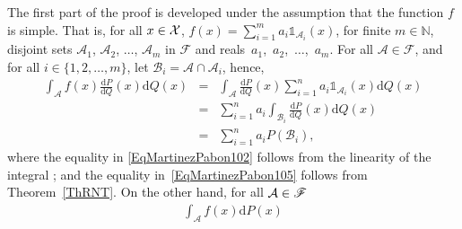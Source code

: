 \documentclass[lettersize,onecolumn]{IEEEtran}
\begin{document}
\begin{IEEEproof}
The first part of the proof is developed under the assumption that the function $f$ is simple. That is, for all $x \in \mathcal X$, 
%
 $f(x) = \sum_{i=1}^{m} a_i \mathds{1}_{\mathcal{A}_i} (x)$, for finite $m \in \mathds{N}$, disjoint sets $\mathcal{A}_1$, $\mathcal{A}_2$, $\ldots$, $\mathcal{A}_m$ in $\mathscr{F}$  and reals~$a_1$,~$a_2$,~$\ldots$,~$a_m$. 
For all $\mathcal{A} \in \mathscr{F}$, and for all $i \in \lbrace 1,2, \ldots, m \rbrace$, let  $\mathcal{B}_i = 
\mathcal{A} \cap \mathcal{A}_i$, hence, %
\begin{eqnarray}
\label{EqMartinezPabon101}
\int_{\mathcal{A}} f(x)  \frac{\mathrm{d}P}{\mathrm{d}Q}(x) \mathrm{d} Q (x)
& = & \int_{\mathcal{A}} \frac{\mathrm{d}P}{\mathrm{d}Q} (x) \sum_{i=1}^{n} a_i \mathds{1}_{\mathcal{A}_i} (x) \mathrm{d} Q(x)\\
%
\label{EqMartinezPabon102}
%
%
&  = & \sum_{i=1}^{n} a_i \int_{\mathcal{B}_i}  \frac{\mathrm{d}P}{\mathrm{d}Q}(x) \mathrm{d} Q(x) \\
\label{EqMartinezPabon105}
&  = & \sum_{i=1}^{n} a_i P (\mathcal{B}_i),
\end{eqnarray} 
where the equality in \eqref{EqMartinezPabon102} follows from the linearity of the integral \cite[Theorem~1.6.3]{ash2000probability}; 
and the equality in~\eqref{EqMartinezPabon105} follows from Theorem~\ref{ThRNT}. %
%
On the other hand, for all $\mathcal A \in \mathscr{F}$
\begin{eqnarray}
\label{EqDiscoverMyReviewer101}
\displaystyle\int_{\mathcal{A}} f(x) \mathrm{d} P(x)  

\end{eqnarray}
\end{IEEEproof}
\end{document}
